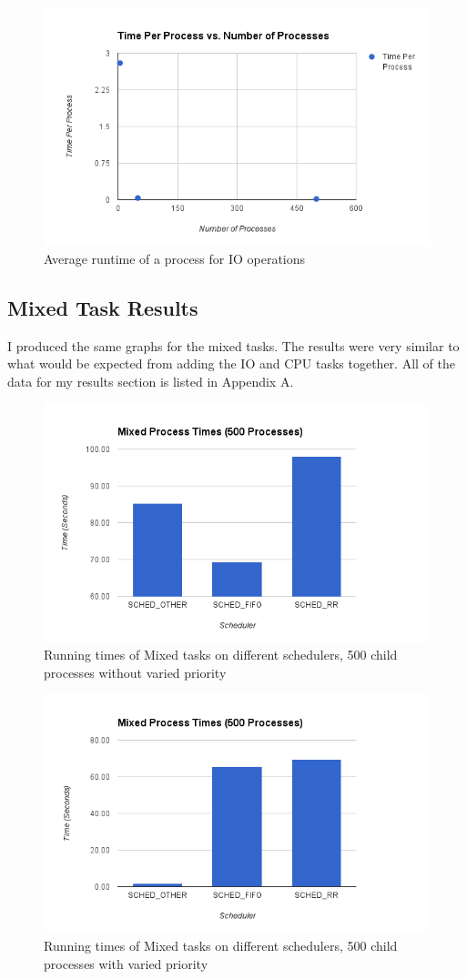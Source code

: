 \documentclass{article}
\begin{document}
\begin{figure}[H]
  \centering
  \includegraphics[width=0.8\linewidth]{IOAverageRuntime.png}
  \caption{Average runtime of a process for IO operations}
\end{figure}

\subsection{Mixed Task Results}

I produced the same graphs for the mixed tasks. The results were very similar to what would be expected from adding the IO and CPU tasks together. All of the data for my results section is listed in Appendix A.


\begin{figure}[H]
  \centering
  \includegraphics[width=0.8\linewidth]{MixedNotVaried.png}
  \caption{Running times of Mixed tasks on different schedulers, 500 child processes without varied priority}
\end{figure}


\begin{figure}[H]
  \centering
  \includegraphics[width=0.8\linewidth]{MixedVaried.png}
  \caption{Running times of Mixed tasks on different schedulers, 500 child processes with varied priority}
\end{figure}
\end{document}
